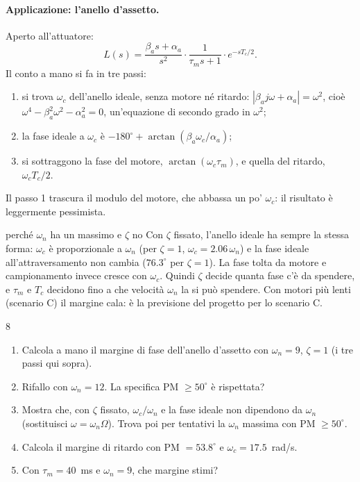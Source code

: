 \documentclass[11pt,a4paper]{article}
\begin{document}
\paragraph{Applicazione: l'anello d'assetto.} Aperto all'attuatore:
\[
L(s) = \frac{\beta_a s + \alpha_a}{s^2}\cdot\frac{1}{\tau_m s + 1}\cdot e^{-sT_c/2}.
\]
Il conto a mano si fa in tre passi:
\begin{enumerate}
  \item si trova $\omega_c$ dell'anello ideale, senza motore né ritardo: $|\beta_a j\omega + \alpha_a| = \omega^2$, cioè $\omega^4 - \beta_a^2\omega^2 - \alpha_a^2 = 0$, un'equazione di secondo grado in $\omega^2$;
  \item la fase ideale a $\omega_c$ è $-180^\circ + \arctan(\beta_a\omega_c/\alpha_a)$;
  \item si sottraggono la fase del motore, $\arctan(\omega_c\tau_m)$, e quella del ritardo, $\omega_c T_c/2$.
\end{enumerate}
Il passo 1 trascura il modulo del motore, che abbassa un po' $\omega_c$: il risultato è leggermente pessimista.

\begin{fisica}{perché $\omega_n$ ha un massimo e $\zeta$ no}
Con $\zeta$ fissato, l'anello ideale ha sempre la stessa forma: $\omega_c$ è proporzionale a $\omega_n$ (per $\zeta = 1$, $\omega_c = 2.06\,\omega_n$) e la fase ideale all'attraversamento non cambia ($76.3^\circ$ per $\zeta = 1$). La fase tolta da motore e campionamento invece cresce con $\omega_c$. Quindi $\zeta$ decide quanta fase c'è da spendere, e $\tau_m$ e $T_c$ decidono fino a che velocità $\omega_n$ la si può spendere. Con motori più lenti (scenario C) il margine cala: è la previsione del progetto per lo scenario C.
\end{fisica}

\begin{esercizio}{8}
\begin{enumerate}[label=(\alph*)]
  \item Calcola a mano il margine di fase dell'anello d'assetto con $\omega_n = 9$, $\zeta = 1$ (i tre passi qui sopra).
  \item Rifallo con $\omega_n = 12$. La specifica PM $\ge 50^\circ$ è rispettata?
  \item Mostra che, con $\zeta$ fissato, $\omega_c/\omega_n$ e la fase ideale non dipendono da $\omega_n$ (sostituisci $\omega = \omega_n\Omega$). Trova poi per tentativi la $\omega_n$ massima con PM $\ge 50^\circ$.
  \item Calcola il margine di ritardo con PM $= 53.8^\circ$ e $\omega_c = 17.5$~rad/s.
  \item Con $\tau_m = 40$~ms e $\omega_n = 9$, che margine stimi?
\end{enumerate}
\end{esercizio}
\end{document}
